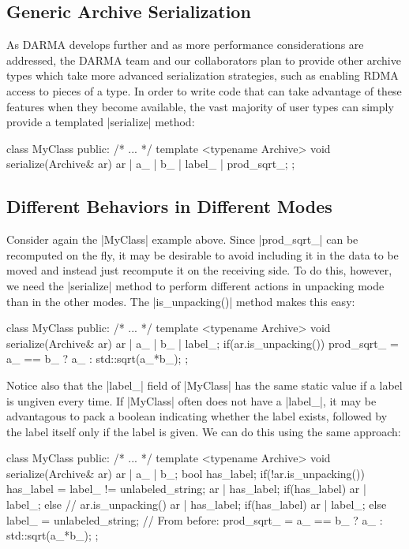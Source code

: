 \subsection{Generic Archive Serialization}

As DARMA develops further and as more performance considerations are addressed,
the DARMA team and our collaborators plan to provide other archive types which
take more advanced serialization strategies, such as enabling \gls{RDMA}
access to pieces of a type.  In order to write code that can take advantage of
these features when they become available, the vast majority of user types can
simply provide a templated |serialize| method:
\begin{CppCodeNumb}
class MyClass {
  public:
    /* ... */
    template <typename Archive>
    void serialize(Archive& ar) {
      ar | a_ | b_ | label_ | prod_sqrt_;
    }
};
\end{CppCodeNumb}

\subsection{Different Behaviors in Different Modes}

Consider again the |MyClass| example above.  Since |prod_sqrt_| can be
recomputed on the fly, it may be desirable to avoid including it in the data to
be moved and instead just recompute it on the receiving side.  To do this, however,
we need the |serialize| method to perform different actions in unpacking mode
than in the other modes.  The |is_unpacking()| method makes this easy:
%
\begin{CppCodeNumb}
class MyClass {
  public:
    /* ... */
    template <typename Archive>
    void serialize(Archive& ar) {
      ar | a_ | b_ | label_;
      if(ar.is_unpacking())
        prod_sqrt_ = a_ == b_ ? a_ : std::sqrt(a_*b_);
    }
};
\end{CppCodeNumb}
%
Notice also that the |label_| field of |MyClass| has the same static value if a
label is ungiven every time.  If |MyClass| often does not have a |label_|, it
may be advantagous to pack a boolean indicating whether the label exists,
followed by the label itself only if the label is given.  We can do this using
the same approach:
\begin{CppCodeNumb}
class MyClass {
  public:
    /* ... */
    template <typename Archive>
    void serialize(Archive& ar) {
      ar | a_ | b_;
      bool has_label;
      if(!ar.is_unpacking()) {
        has_label = label_ != unlabeled_string;
        ar | has_label;
        if(has_label) ar | label_;
      }
      else { // ar.is_unpacking()
        ar | has_label;
        if(has_label) ar | label_;
        else label_ = unlabeled_string;    
        // From before:
        prod_sqrt_ = a_ == b_ ? a_ : std::sqrt(a_*b_);
      }
    }
};
\end{CppCodeNumb}

